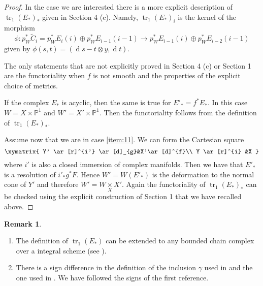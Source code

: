 \documentclass[10pt,twoside]{article}
\numberwithin{equation}{section}
\theoremstyle{plain}
\theoremstyle{definition}
\newtheorem{remark}[equation]{Remark}
\DeclareMathOperator{\tr}{tr}
\DeclareMathOperator{\dd}{d}
\begin{document}
\begin{proof}
  In the case we are interested there is a more explicit description of
  $\tr_{1}(E_{\ast})_{\ast}$ given in \cite{BismutGilletSoule:MR1086887}
  Section 4 (c). Namely, $\tr_{1}(E_{\ast})_{i}$ is the kernel of the
  morphism
  \begin{equation}\label{eq:32}
    \phi \colon  p_{W}^{\ast}\widetilde C_{i}=
    p_{W}^{\ast}E_{i}(i)\oplus p_{W}^{\ast}E_{i-1}(i-1)\longrightarrow 
    p_{W}^{\ast}E_{i-1}(i)\oplus p_{W}^{\ast}E_{i-2}(i-1)
  \end{equation}
  given by $\phi(s,t)=(\dd s-t\otimes y,\dd t)$.

  The only statements that are not explicitly proved in
  \cite{BismutGilletSoule:MR1086887} 
  Section 4 (c) 
  or \cite{GilletSoule:aRRt} Section 1 are the functoriality when $f$
  is not smooth and the properties of the  explicit choice of metrics. 

  If the complex
  $E_{\ast}$ is acyclic,
  then 
  the same is true for
  $E'_{\ast}=f^{\ast}E_{\ast}$. In this case $W=X\times
  \mathbb{P}^{1}$ and $W'=X'\times \mathbb{P}^{1}$. Then the
  functoriality follows from the definition of $\tr_{1}(E_{\ast})_{\ast}$.

  Assume now that we are in case \ref{item:11}. We can form the
  Cartesian square
  \begin{displaymath}
    \xymatrix{
      Y' \ar[r]^{i'} \ar[d]_{g}&X'\ar[d]^{f}\\
      Y \ar[r]^{i} &X
    }
  \end{displaymath}
  where $i'$ is also a closed immersion of complex
  manifolds. Then we have that $E'_{\ast}$ is a resolution of
  $i'_{\ast}g^{\ast} F$. Hence $W'=W(E'_{\ast})$ is the
  deformation to the normal cone of $Y'$ and therefore
  $W'=W\underset{X}{\times}X'$. Again the functoriality of
  $\tr_{1}(E_{\ast})_{\ast}$ can be checked using the 
  explicit construction of \cite{GilletSoule:aRRt} Section 1 that we
  have recalled above.
\end{proof}

\begin{remark}
  \begin{enumerate}
  \item The definition of $\tr_{1}(E_{\ast})$ can be extended to any bounded
    chain complex
    over a integral scheme (see \cite{GilletSoule:aRRt}). 
  \item There is a sign difference in the definition of the
    inclusion $\gamma $ used in \cite{GilletSoule:aRRt} and the one
    used in  \cite{BismutGilletSoule:MR1086887}. We have followed the
    signs of the 
    first reference.
  \end{enumerate}
\end{remark}
\end{document}
